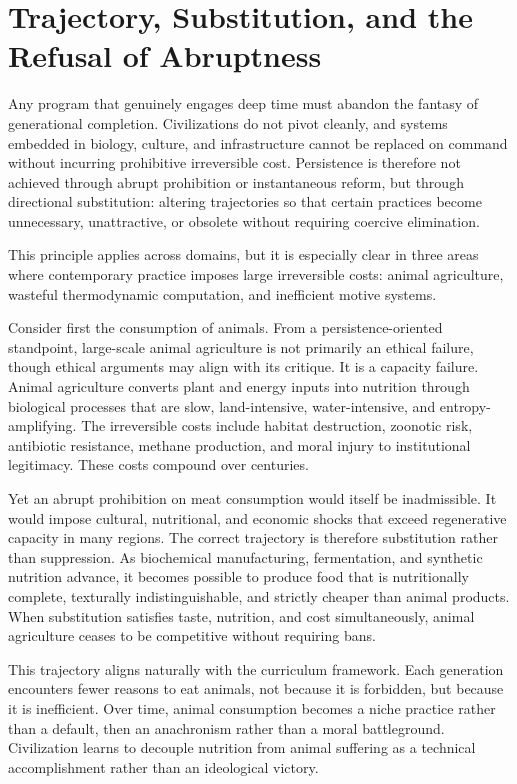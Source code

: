 \documentclass[12pt,oneside]{book}
\begin{document}
\chapter{Trajectory, Substitution, and the Refusal of Abruptness}

Any program that genuinely engages deep time must abandon the fantasy of generational completion. Civilizations do not pivot cleanly, and systems embedded in biology, culture, and infrastructure cannot be replaced on command without incurring prohibitive irreversible cost. Persistence is therefore not achieved through abrupt prohibition or instantaneous reform, but through directional substitution: altering trajectories so that certain practices become unnecessary, unattractive, or obsolete without requiring coercive elimination.

This principle applies across domains, but it is especially clear in three areas where contemporary practice imposes large irreversible costs: animal agriculture, wasteful thermodynamic computation, and inefficient motive systems.

Consider first the consumption of animals. From a persistence-oriented standpoint, large-scale animal agriculture is not primarily an ethical failure, though ethical arguments may align with its critique. It is a capacity failure. Animal agriculture converts plant and energy inputs into nutrition through biological processes that are slow, land-intensive, water-intensive, and entropy-amplifying. The irreversible costs include habitat destruction, zoonotic risk, antibiotic resistance, methane production, and moral injury to institutional legitimacy. These costs compound over centuries.

Yet an abrupt prohibition on meat consumption would itself be inadmissible. It would impose cultural, nutritional, and economic shocks that exceed regenerative capacity in many regions. The correct trajectory is therefore substitution rather than suppression. As biochemical manufacturing, fermentation, and synthetic nutrition advance, it becomes possible to produce food that is nutritionally complete, texturally indistinguishable, and strictly cheaper than animal products. When substitution satisfies taste, nutrition, and cost simultaneously, animal agriculture ceases to be competitive without requiring bans.

This trajectory aligns naturally with the curriculum framework. Each generation encounters fewer reasons to eat animals, not because it is forbidden, but because it is inefficient. Over time, animal consumption becomes a niche practice rather than a default, then an anachronism rather than a moral battleground. Civilization learns to decouple nutrition from animal suffering as a technical accomplishment rather than an ideological victory.
\end{document}
